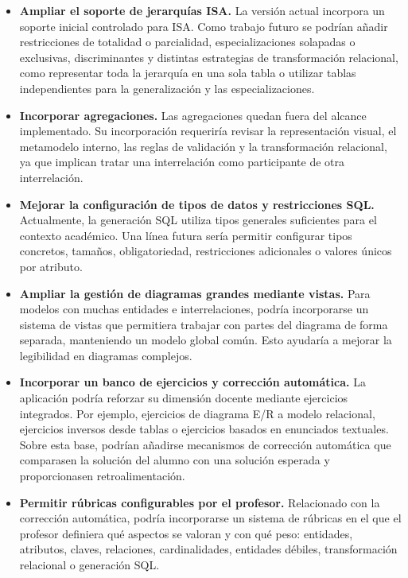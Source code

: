 \begin{itemize}
    \item \textbf{Ampliar el soporte de jerarquías ISA.}  
    La versión actual incorpora un soporte inicial controlado para ISA. Como trabajo futuro se podrían añadir restricciones de totalidad o parcialidad, especializaciones solapadas o exclusivas, discriminantes y distintas estrategias de transformación relacional, como representar toda la jerarquía en una sola tabla o utilizar tablas independientes para la generalización y las especializaciones.

    \item \textbf{Incorporar agregaciones.}  
    Las agregaciones quedan fuera del alcance implementado. Su incorporación requeriría revisar la representación visual, el metamodelo interno, las reglas de validación y la transformación relacional, ya que implican tratar una interrelación como participante de otra interrelación.

    \item \textbf{Mejorar la configuración de tipos de datos y restricciones SQL.}  
    Actualmente, la generación SQL utiliza tipos generales suficientes para el contexto académico. Una línea futura sería permitir configurar tipos concretos, tamaños, obligatoriedad, restricciones adicionales o valores únicos por atributo.

    \item \textbf{Ampliar la gestión de diagramas grandes mediante vistas.}  
    Para modelos con muchas entidades e interrelaciones, podría incorporarse un sistema de vistas que permitiera trabajar con partes del diagrama de forma separada, manteniendo un modelo global común. Esto ayudaría a mejorar la legibilidad en diagramas complejos.

    \item \textbf{Incorporar un banco de ejercicios y corrección automática.}  
    La aplicación podría reforzar su dimensión docente mediante ejercicios integrados. Por ejemplo, ejercicios de diagrama E/R a modelo relacional, ejercicios inversos desde tablas o ejercicios basados en enunciados textuales. Sobre esta base, podrían añadirse mecanismos de corrección automática que comparasen la solución del alumno con una solución esperada y proporcionasen retroalimentación.

    \item \textbf{Permitir rúbricas configurables por el profesor.}  
    Relacionado con la corrección automática, podría incorporarse un sistema de rúbricas en el que el profesor definiera qué aspectos se valoran y con qué peso: entidades, atributos, claves, relaciones, cardinalidades, entidades débiles, transformación relacional o generación SQL.


\end{itemize}
